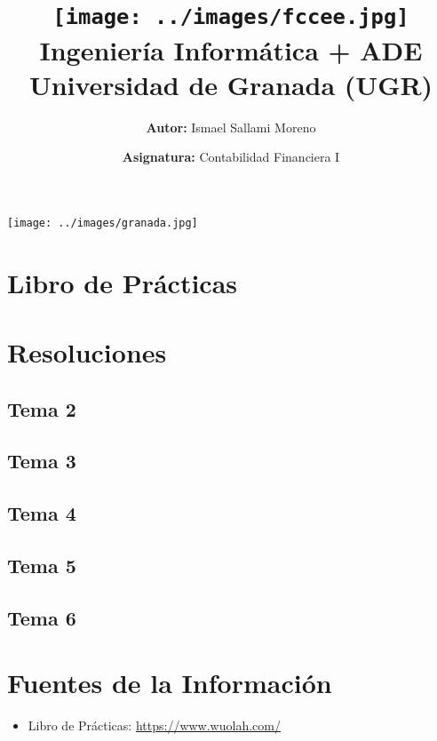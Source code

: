 \documentclass[a4paper,12pt]{article}
\title{
    \vspace{-2cm}
    \texttt{[image: ../images/fccee.jpg]} \\ %
    \LARGE Ingeniería Informática + ADE\\
    \large Universidad de Granada (UGR)\\[1cm]
}
\author{\textbf{Autor:} Ismael Sallami Moreno}
\date{\textbf{Asignatura:} Contabilidad Financiera I}
\begin{document}
\maketitle
\thispagestyle{empty}

\begin{center}
    \texttt{[image: ../images/granada.jpg]} \\ %
    \vfill
\end{center}

\newpage

\tableofcontents
\newpage

\section{Libro de Prácticas}



\section{Resoluciones}

\subsection{Tema 2}

\subsection{Tema 3}

\subsection{Tema 4}
% 

\subsection{Tema 5}

\subsection{Tema 6}


\section{Fuentes de la Información}
\begin{itemize}
    \item Libro de Prácticas: \url{https://www.wuolah.com/}
\end{itemize}
\end{document}
